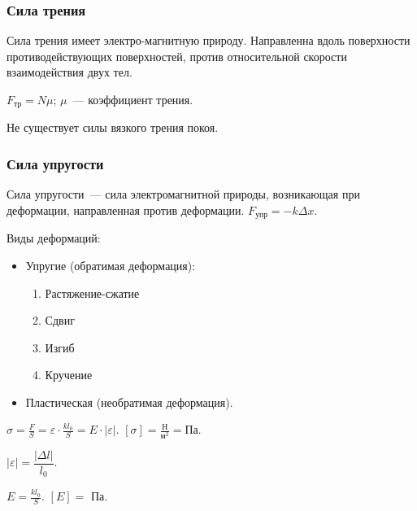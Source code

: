 \documentclass[12pt]{article}
\begin{document}
	\subsubsection{Сила трения}
	\begin{definition}
		Сила трения имеет электро-магнитную природу. Направленна вдоль поверхности противодействующих поверхностей, против относительной скорости взаимодействия двух тел.
	\end{definition}
	\begin{definition}
		$F_{\text{тр}} = N\mu$; $\mu$~--- коэффициент трения.
	\end{definition}
	\begin{statement}
		Не существует силы вязкого трения покоя.
	\end{statement}
	\subsubsection{Сила упругости}
	\begin{definition}
		Сила упругости~--- сила электромагнитной природы, возникающая при деформации, направленная против деформации. $F_{\text{упр}} = -k \varDelta x$.
	\end{definition}
	\begin{definition}
		Виды деформаций:
		\begin{itemize}
			\item Упругие (обратимая деформация):
			\begin{enumerate}
				\item Растяжение-сжатие
				\item Сдвиг
				\item Изгиб
				\item Кручение
			\end{enumerate}
			\item Пластическая (необратимая деформация).
		\end{itemize}
	\end{definition}
	\begin{definition}
		$\sigma = \frac{F}{S} = \varepsilon \cdot \frac{kl_0}{S} = E \cdot |\varepsilon|$. $[\sigma] = \frac{\text{Н}}{\text{м}^2} = \text{Па}$.
	\end{definition}
	\begin{definition}
		$|\varepsilon| = \dfrac{|\varDelta l|}{l_0}$.
	\end{definition}
	\begin{definition}
		$E = \frac{kl_0}{S}$. $[E] =$ Па.
	\end{definition}
\end{document}
